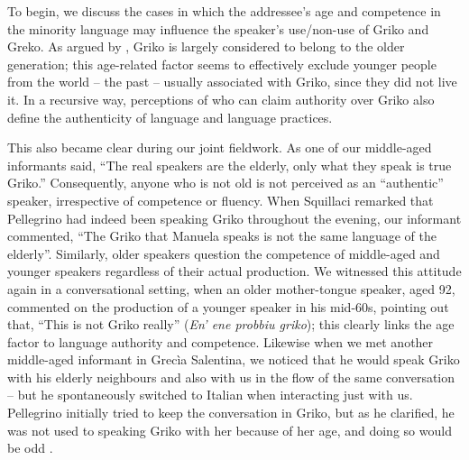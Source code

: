 \documentclass[output=paper,hidelinks]{langscibook}
\begin{document}
To begin, we discuss the cases in which the addressee’s age and competence in the minority language may influence the speaker’s use/non-use of Griko and Greko. As argued by \citet{Pellegrino2021}, Griko is largely considered to belong to the older generation; this age-related factor seems to effectively exclude younger people from the world -- the past -- usually associated with Griko, since they did not live it. In a recursive way, perceptions of who can claim authority over Griko also define the authenticity of language and language practices. 



This also became clear during our joint fieldwork. As one of our middle-aged informants said, “The real speakers are the elderly, only what they speak is true Griko.” Consequently, anyone who is not old is not perceived as an ``authentic'' speaker, irrespective of competence or fluency. When Squillaci remarked that Pellegrino had indeed been speaking Griko throughout the evening, our informant commented, “The Griko that Manuela speaks is not the same language of the elderly”. Similarly, older speakers question the competence of middle-aged and younger speakers regardless of their actual production. We witnessed this attitude again in a conversational setting, when an older mother-tongue speaker, aged 92, commented on the production of a younger speaker in his mid-60s, pointing out that, “This is not Griko really” (\textit{En' ene probbiu griko}); this clearly links the age factor to language authority and competence. Likewise when we met another middle-aged informant in Grecìa Salentina, we noticed that he would speak Griko with his elderly neighbours and also with us in the flow of the same conversation -- but he spontaneously switched to Italian when interacting just with us. Pellegrino initially tried to keep the conversation in Griko, but as he clarified, he was not used to speaking Griko with her because of her age, and doing so would be odd \citep[]{pellegrino2022agency}.
\end{document}
